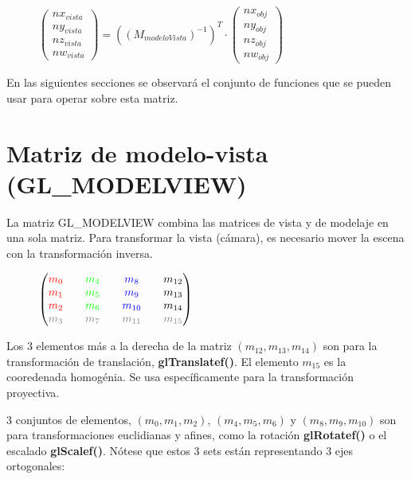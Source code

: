 \begin{figure}[ht]
  \centering
  \(
  \begin{pmatrix}
    nx_{vista}\\ny_{vista}\\nz_{vista}\\nw_{vista}
  \end{pmatrix}
  = ((M_{modeloVista})^{-1})^T \cdot
  \begin{pmatrix}
    nx_{obj}\\ny_{obj}\\nz_{obj}\\nw_{obj}
  \end{pmatrix}
  \)
\end{figure}
En las siguientes secciones se observará el conjunto de funciones que se pueden usar para operar sobre esta matriz.

\section{Matriz de modelo-vista (GL\_MODELVIEW)}
La matriz GL\_MODELVIEW combina las matrices de vista y de modelaje en una sola matriz. Para transformar la vista (cámara), es necesario mover la escena con la transformación inversa.

\begin{figure}[ht]
  \centering
  \(
  \begin{pmatrix}
    \textcolor{red}{m_0} && \textcolor{green}{m_4} && \textcolor{blue}{m_8} && m_{12}\\
    \textcolor{red}{m_1} && \textcolor{green}{m_5} && \textcolor{blue}{m_9} && m_{13}\\
    \textcolor{red}{m_2} && \textcolor{green}{m_6} && \textcolor{blue}{m_{10}} && m_{14}\\
    \textcolor{gray}{m_3} && \textcolor{gray}{m_7} && \textcolor{gray}{m_{11}} && \textcolor{gray}{m_{15}}
  \end{pmatrix}
  \)
\end{figure}

Los 3 elementos más a la derecha de la matriz \((m_{12}, m_{13}, m_{14})\) son para la transformación de translación, \textbf{glTranslatef()}. El elemento \(m_{15}\) es la cooredenada homogénia. Se usa específicamente para la transformación proyectiva.

3 conjuntos de elementos, \((m_0, m_1, m_2)\), \((m_4, m_5, m_6)\) y \((m_8, m_9, m_{10})\) son para transformaciones euclidianas y afines, como la rotación \textbf{glRotatef()} o el escalado \textbf{glScalef()}. Nótese que estos 3 sets están representando 3 ejes ortogonales:

